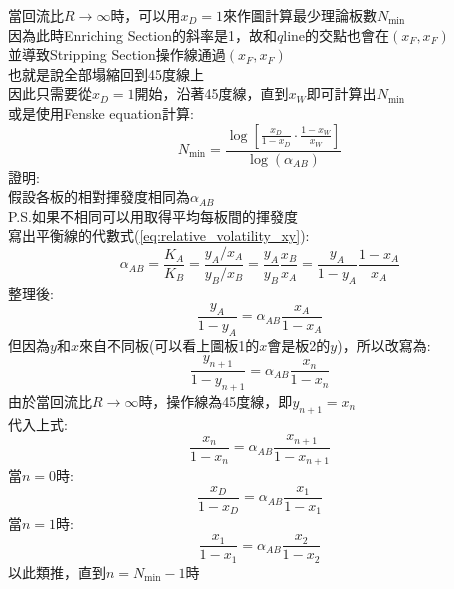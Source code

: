 \documentclass[../main.tex]{subfiles}
\begin{document}
\begin{itemize}
\begin{itemize}
\begin{itemize}
      當回流比$R\to\infty$時，可以用$x_D=1$來作圖計算最少理論板數$N_{\text{min}}$\\
      因為此時Enriching Section的斜率是1，故和$q$line的交點也會在$(x_F,x_F)$\\
      並導致Stripping Section操作線通過$(x_F,x_F)$\\
      也就是說全部塌縮回到45度線上\\
      因此只需要從$x_D=1$開始，沿著45度線，直到$x_W$即可計算出$N_{\text{min}}$\\
      或是使用Fenske equation計算:
      \begin{equation}
        \boxed{
          N_{\text{min}} = \frac{\log\left[\frac{x_D}{1-x_D}\cdot\frac{1-x_W}{x_W}\right]}{\log(\alpha_{AB})}
        }
      \end{equation}
      證明:\\
      假設各板的相對揮發度相同為$\alpha_{AB}$\\
      P.S.如果不相同可以用取得平均每板間的揮發度\\
      寫出平衡線的代數式(\ref{eq:relative_volatility_xy}):
      \begin{equation}
        \alpha_{AB} = \frac{K_A}{K_B} = \frac{y_A/x_A}{y_B/x_B} = \frac{y_A}{y_B}\frac{x_B}{x_A}
        = \frac{y_A}{1-y_A}\frac{1-x_A}{x_A}
      \end{equation}
      整理後:
      \begin{equation}
        \frac{y_A}{1-y_A} = \alpha_{AB}\frac{x_A}{1-x_A}
      \end{equation}
      但因為$y$和$x$來自不同板(可以看上圖板1的$x$會是板2的$y$)，所以改寫為:
      \begin{equation}
        \frac{y_{n+1}}{1-y_{n+1}} = \alpha_{AB}\frac{x_n}{1-x_n}
      \end{equation}
      由於當回流比$R\to\infty$時，操作線為45度線，即$y_{n+1}=x_n$\\
      代入上式:
      \begin{equation}
        \frac{x_n}{1-x_n} = \alpha_{AB}\frac{x_{n+1}}{1-x_{n+1}}
      \end{equation}
      當$n=0$時:
      \begin{equation}
        \frac{x_D}{1-x_D} = \alpha_{AB}\frac{x_{1}}{1-x_{1}}
      \end{equation}
      當$n=1$時:
      \begin{equation}
        \frac{x_{1}}{1-x_{1}} = \alpha_{AB}\frac{x_{2}}{1-x_{2}}
      \end{equation}
      以此類推，直到$n=N_{\text{min}}-1$時

\end{itemize}
\end{itemize}
\end{itemize}
\end{document}

